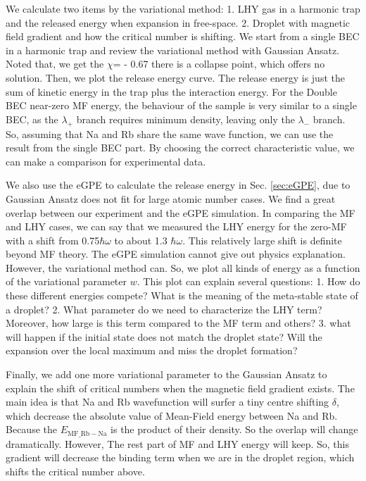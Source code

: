We calculate two items by the variational method: 1. LHY gas in a harmonic trap and the released energy when expansion in free-space. 2. Droplet with magnetic field gradient and how the critical number is shifting. We start from a single BEC in a harmonic trap and review the variational method with Gaussian Ansatz. Noted that, we get the $\chi $= - 0.67 there is a collapse point, which offers no solution. Then, we plot the release energy curve. The release energy is just the sum of kinetic energy in the trap plus the interaction energy. For the Double BEC near-zero MF energy, the behaviour of the sample is very similar to a single BEC, as the $\lambda_+$ branch requires minimum density, leaving only the $\lambda_-$ branch. So, assuming that Na and Rb share the same wave function, we can use the result from the single BEC part. By choosing the correct characteristic value, we can make a comparison for experimental data.

We also use the eGPE to calculate the release energy in Sec. \ref{sec:eGPE}, due to Gaussian Ansatz does not fit for large atomic number cases. We find a great overlap between our experiment and the eGPE simulation. In comparing the MF and LHY cases, we can say that we measured the LHY energy for the zero-MF with a shift from 0.75$\hbar \omega $ to about 1.3 $\hbar\omega$. This relatively large shift is definite beyond MF theory. The eGPE simulation cannot give out physics explanation. However, the variational method can. So, we plot all kinds of energy as a function of the variational parameter $w$. This plot can explain several questions: 1. How do these different energies compete? What is the meaning of the meta-stable state of a droplet? 2. What parameter do we need to characterize the LHY term? Moreover, how large is this term compared to the MF term and others? 3. what will happen if the initial state does not match the droplet state? Will the expansion over the local maximum and miss the droplet formation?

Finally, we add one more variational parameter to the Gaussian Ansatz to explain the shift of critical numbers when the magnetic field gradient exists. The main idea is that Na and Rb wavefunction will surfer a tiny centre shifting $\delta $, which decrease the absolute value of Mean-Field energy between Na and Rb. Because the $E_{\text{MF$\_$Rb}-\text{Na}}$ is the product of their density. So the overlap will change dramatically. However, The rest part of MF and LHY energy will keep. So, this gradient will decrease the binding term when we are in the droplet region, which shifts the critical number above.

